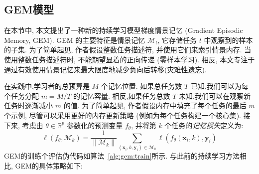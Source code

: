 \subsection{GEM模型}
在本节中, 本文提出了一种新的持续学习模型梯度情景记忆 (Gradient Episodic Memory, GEM). GEM 的主要特征是情景记忆 $\mathcal{M}_t$, 它存储任务 $t$ 中观察到的样本的子集. 为了简单起见, 作者假设整数任务描述符, 并使用它们来索引情景内存. 当使用整数任务描述符时, 不能期望显着的正向传递 (零样本学习). 相反, 本文专注于通过有效使用情景记忆来最大限度地减少负向后转移(灾难性遗忘).

在实践中,学习者的总预算是 $M$ 个记忆位置. 如果总任务数 $T$ 已知,我们可以为每个任务分配 $m = M/T$ 的记忆容量. 相反,如果任务总数 $T$ 未知,我们可以在观察新任务时逐渐减小 $m$ 的值\cite{rebuffiICaRLIncrementalClassifier2017}. 为了简单起见, 作者假设内存中填充了每个任务的最后 $m$ 个示例, 尽管可以采用更好的内存更新策略 (例如为每个任务构建一个核心集). 接下来, 考虑由 $\theta \in \mathbb{R}^p$ 参数化的预测变量 $f_\theta$, 并将第 $k$ 个任务的\textit{记忆损失}定义为:
\[
    \ell\left(f_{\theta}, \mathcal{M}_{k}\right)=\frac{1}{\|\mathcal{M}_{k}\|} \sum_{\left(\boldsymbol{x}_{i}, k, \boldsymbol{y}_{i}\right) \in \mathcal{M}_{k}} \ell\left(f_{\theta}\left(\boldsymbol{x}_{i}, k\right), \boldsymbol{y}_{i}\right)
\]
GEM的训练个评估伪代码如算法~\ref{alg:gem:train}所示. 与此前的持续学习方法相比, GEM的具体策略如下:
